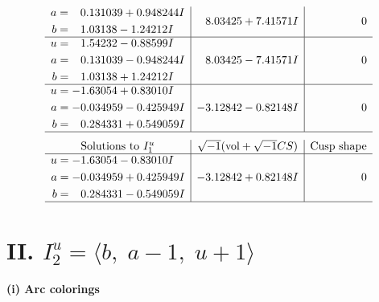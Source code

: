 \documentclass[1p]{elsarticle_modified}
\theoremstyle{definition}
\newcommand{\I}{\sqrt{-1}}
\begin{document}
$$\begin{array}{c|c|c}
\begin{aligned}
a &= \phantom{-}0.131039 + 0.948244 I \\
b &= \phantom{-}1.03138 - 1.24212 I\end{aligned}
 & \phantom{-}8.03425 + 7.41571 I & \phantom{-0.000000 } 0 \\ \hline\begin{aligned}
u &= \phantom{-}1.54232 - 0.88599 I \\
a &= \phantom{-}0.131039 - 0.948244 I \\
b &= \phantom{-}1.03138 + 1.24212 I\end{aligned}
 & \phantom{-}8.03425 - 7.41571 I & \phantom{-0.000000 } 0 \\ \hline\begin{aligned}
u &= -1.63054 + 0.83010 I \\
a &= -0.034959 - 0.425949 I \\
b &= \phantom{-}0.284331 + 0.549059 I\end{aligned}
 & -3.12842 - 0.82148 I & \phantom{-0.000000 } 0\\
 \hline 
 \end{array}$$\newpage$$\begin{array}{c|c|c}  
\text{Solutions to }I^u_{1}& \I (\text{vol} + \sqrt{-1}CS) & \text{Cusp shape}\\
 \hline 
\begin{aligned}
u &= -1.63054 - 0.83010 I \\
a &= -0.034959 + 0.425949 I \\
b &= \phantom{-}0.284331 - 0.549059 I\end{aligned}
 & -3.12842 + 0.82148 I & \phantom{-0.000000 } 0\\
 \hline 
 \end{array}$$\newpage\newpage\renewcommand{\arraystretch}{1}
\centering \section*{II. $I^u_{2}= \langle b,\;a-1,\;u+1 \rangle$}
\flushleft \textbf{(i) Arc colorings}\\
\end{document}
